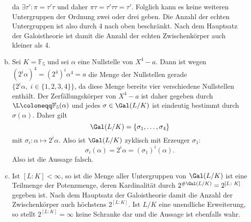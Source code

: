\documentclass{article}
\begin{document}
\begin{enumerate}[(a)]
        da $\exists \tau'\colon \pi = \tau' \tau$ und daher $\pi \tau = \tau' \tau \tau = \tau'$.
        Folglich kann es keine weiteren Untergruppen der Ordnung zwei oder drei geben. 
        Die Anzahl der echten Untergruppen ist also durch 4 nach oben beschränkt. 
        Nach dem Hauptsatz der Galoistheorie ist damit die Anzahl der echten Zwischenkörper auch kleiner als 4.
        \item Sei $K = \mathbb{F}_5$ und sei $\alpha$ eine Nullstelle von $X^4 - a$.
        Dann ist wegen $(2^i \alpha)^4 = (2^4)^i \alpha^4 = a$ die Menge der Nullstellen gerade 
        $\{2^i \alpha,\; i \in \{1,2,3,4\}\}$, da diese Menge bereits vier verschiedene Nullstellen enthält.
        Der Zerfällungskörper von $X^4 - a$ ist daher gegeben durch $\L\coloneqq \mathbb{F}_5(\alpha)$ und 
        jedes $\sigma \in \Gal(L/K)$ ist eindeutig bestimmt durch $\sigma(\alpha)$. Daher gilt 
        \[
            \Gal(L/K) = \{\sigma_1, \dots, \sigma_4\}  
        \]
        mit $\sigma_i \colon \alpha \mapsto 2^i \alpha$. Also ist $\Gal(L/K)$ zyklisch mit Erzeuger $\sigma_1$:
        \[
            \sigma_i(\alpha) = 2^i \alpha = (\sigma_1)^i(\alpha).
        \]
        Also ist die Aussage falsch.
        \item Ist $[L\colon K] < \infty$, so ist die Menge aller Untergruppen von $\Gal(L/K)$ ist eine Teilmenge der Potenzmenge, 
        deren Kardinalität durch $2^{\# \Gal(L/K)} = 2^{[L\colon K]}$ gegeben ist.
        Nach dem Hauptsatz der Galoistheorie damit die Anzahl der Zwischenkörper auch höchstens $2^{[L\colon K]}$.
        Ist $L/K$ eine unendliche Erweiterung, so stellt $2^{[L\colon K]} = \infty$ keine Schranke dar und die 
        Aussage ist ebenfalls wahr.
    \end{enumerate}
\end{document}
